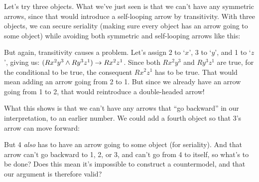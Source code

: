 Let's try three objects.  What we've just seen is that we can't have any symmetric arrows, since that would introduce a self-looping arrow by transitivity.  With three objects, we can secure seriality (making sure every object has an arrow going to some object) while avoiding both symmetric and self-looping arrows like this:
\begin{center}
\end{center}
But again, transitivity causes a problem.  Let's assign 2 to `$x$', 3 to `$y$', and 1 to `$z$', giving us: $(Rx^2y^3 \wedge Ry^3z^1) \rightarrow Rx^2z^1$.  Since both $Rx^2y^3$ and $Ry^3z^1$ are true, for the conditional to be true, the consequent $Rx^2z^1$ has to be true.   That would mean adding an arrow going from 2 to 1.  But since we already have an arrow going from 1 to 2,  that would reintroduce a double-headed arrow!

What this shows is that we can't have any arrows that ``go backward'' in our interpretation, to an earlier number.  We could add a fourth object so that 3's arrow can move forward:
\begin{center}
\end{center}
But 4 \emph{also} has to have an arrow going to some object (for seriality).  And that arrow can't go backward to 1, 2, or 3, and can't go from 4 to itself, so what's to be done? Does this mean it's impossible to construct a countermodel, and that our argument is therefore valid?

